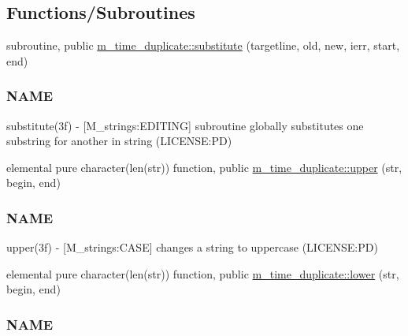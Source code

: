 \subsection*{Functions/\+Subroutines}
\begin{DoxyCompactItemize}
\item 
subroutine, public \mbox{\hyperlink{namespacem__time__duplicate_abc203f3a6afc1edeecbcdc58b187a5d5}{m\+\_\+time\+\_\+duplicate\+::substitute}} (targetline, old, new, ierr, start, end)
\begin{DoxyCompactList}\small\item\em \subsubsection*{N\+A\+ME}

substitute(3f) -\/ \mbox{[}M\+\_\+strings\+:E\+D\+I\+T\+I\+NG\mbox{]} subroutine globally substitutes one substring for another in string (L\+I\+C\+E\+N\+SE\+:PD) \end{DoxyCompactList}\item 
elemental pure character(len(str)) function, public \mbox{\hyperlink{namespacem__time__duplicate_aabdd1a3e01b26e896bd06aee488de7c6}{m\+\_\+time\+\_\+duplicate\+::upper}} (str, begin, end)
\begin{DoxyCompactList}\small\item\em \subsubsection*{N\+A\+ME}

upper(3f) -\/ \mbox{[}M\+\_\+strings\+:C\+A\+SE\mbox{]} changes a string to uppercase (L\+I\+C\+E\+N\+SE\+:PD) \end{DoxyCompactList}\item 
elemental pure character(len(str)) function, public \mbox{\hyperlink{namespacem__time__duplicate_af8b4555e0c47e2ec327f0434d84b9c56}{m\+\_\+time\+\_\+duplicate\+::lower}} (str, begin, end)
\begin{DoxyCompactList}\small\item\em \subsubsection*{N\+A\+ME}


\end{DoxyCompactList}
\end{DoxyCompactItemize}
